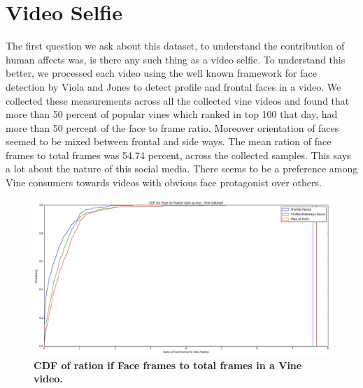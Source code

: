 \section {Video Selfie}
The first question we ask about this dataset, to understand the contribution of human affects was, is there any such thing as a video selfie. To understand this better, we processed each video using the well known framework for face detection by Viola and Jones \cite{Viola:2004:RRF:966432.966458} to detect profile and frontal faces in a video. We collected these measurements across all the collected vine videos and found that more than 50 percent of popular vines which ranked in top 100 that day, had more than 50 percent of the face to frame ratio. Moreover orientation of faces seemed to be mixed between frontal and side ways. The mean ration of face frames to total frames was 54.74 percent, across the collected samples. This says a lot about the nature of this social media. There seems to be a preference among Vine consumers towards videos with obvious face protagonist over others. 

\begin{figure}
\centering
\includegraphics[width=\columnwidth]{plots/CDF_FACE_PROFILE}
\caption{\textbf{CDF of ration if Face frames to total frames in a Vine video.}}
\label{fig:Like_Repost_CDF}
\end{figure}
